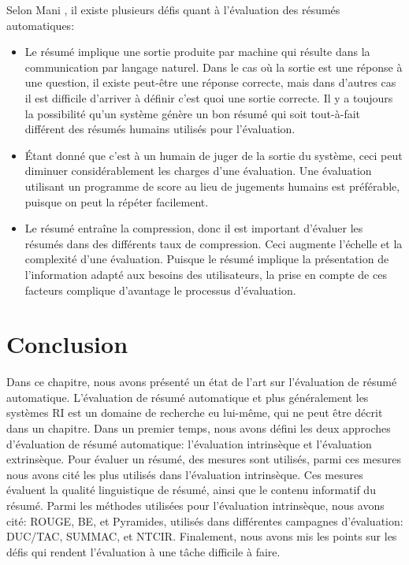 \documentclass[a4paper,12pt,oneside]{../use/ESIthesis}
\begin{document}
Selon Mani \cite{01-mani}, il existe plusieurs défis quant à l'évaluation des résumés automatiques:
\begin{itemize}
\item Le résumé implique une sortie produite par machine qui résulte dans la communication par langage naturel. 
Dans le cas où la sortie est une réponse à une question, il existe peut-être une réponse correcte, mais dans d'autres cas il est difficile d'arriver à définir c'est quoi une sortie correcte.
Il y a toujours la possibilité qu'un système génère un bon résumé qui soit tout-à-fait différent des résumés humains utilisés pour l'évaluation. 

\item Étant donné que c'est à un humain de juger de la sortie du système, ceci peut diminuer considérablement les charges d'une évaluation. 
Une évaluation utilisant un programme de score au lieu de jugements humains est préférable, puisque on peut la répéter facilement. 

\item Le résumé entraîne la compression, donc il est important d'évaluer les résumés dans des différents taux de compression. 
Ceci augmente l'échelle et la complexité d'une évaluation. 
Puisque le résumé implique la présentation de l'information adapté aux besoins des utilisateurs, la prise en compte de ces facteurs complique d'avantage le processus d'évaluation. 
\end{itemize}

\section{Conclusion}

Dans ce chapitre, nous avons présenté un état de l'art sur l'évaluation de résumé automatique. 
L'évaluation de résumé automatique et plus généralement les systèmes RI est un domaine de recherche eu lui-même, qui ne peut être décrit dans un chapitre. 
Dans un premier temps, nous avons défini les deux approches d'évaluation de résumé automatique: l'évaluation intrinsèque et l'évaluation extrinsèque. 
Pour évaluer un résumé, des mesures sont utilisés, parmi ces mesures nous avons cité les plus utilisés dans l'évaluation intrinsèque. 
Ces mesures évaluent la qualité linguistique de résumé, ainsi que le contenu informatif du résumé. 
Parmi les méthodes utilisées pour l'évaluation intrinsèque, nous avons cité: ROUGE, BE, et Pyramides, utilisés dans différentes campagnes d'évaluation: DUC/TAC, SUMMAC, et NTCIR. 
Finalement, nous avons mis les points sur les défis qui rendent l'évaluation à une tâche difficile à faire. 
\end{document}
